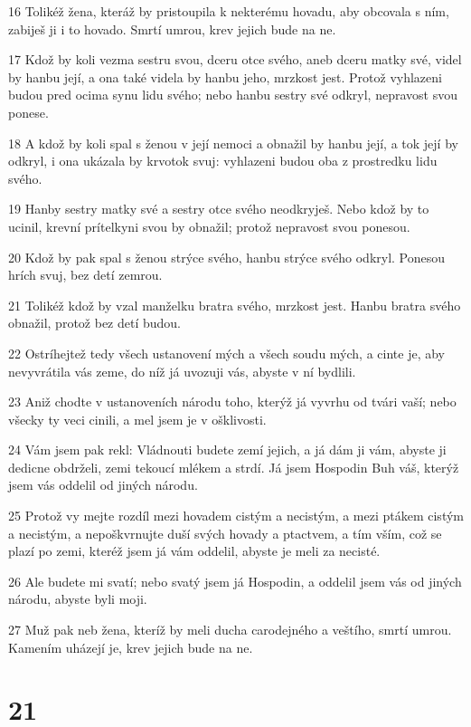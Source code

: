 \par 16 Tolikéž žena, kteráž by pristoupila k nekterému hovadu, aby obcovala s ním, zabiješ ji i to hovado. Smrtí umrou, krev jejich bude na ne.
\par 17 Kdož by koli vezma sestru svou, dceru otce svého, aneb dceru matky své, videl by hanbu její, a ona také videla by hanbu jeho, mrzkost jest. Protož vyhlazeni budou pred ocima synu lidu svého; nebo hanbu sestry své odkryl, nepravost svou ponese.
\par 18 A kdož by koli spal s ženou v její nemoci a obnažil by hanbu její, a tok její by odkryl, i ona ukázala by krvotok svuj: vyhlazeni budou oba z prostredku lidu svého.
\par 19 Hanby sestry matky své a sestry otce svého neodkryješ. Nebo kdož by to ucinil, krevní prítelkyni svou by obnažil; protož nepravost svou ponesou.
\par 20 Kdož by pak spal s ženou strýce svého, hanbu strýce svého odkryl. Ponesou hrích svuj, bez detí zemrou.
\par 21 Tolikéž kdož by vzal manželku bratra svého, mrzkost jest. Hanbu bratra svého obnažil, protož bez detí budou.
\par 22 Ostríhejtež tedy všech ustanovení mých a všech soudu mých, a cinte je, aby nevyvrátila vás zeme, do níž já uvozuji vás, abyste v ní bydlili.
\par 23 Aniž chodte v ustanoveních národu toho, kterýž já vyvrhu od tvári vaší; nebo všecky ty veci cinili, a mel jsem je v ošklivosti.
\par 24 Vám jsem pak rekl: Vládnouti budete zemí jejich, a já dám ji vám, abyste ji dedicne obdrželi, zemi tekoucí mlékem a strdí. Já jsem Hospodin Buh váš, kterýž jsem vás oddelil od jiných národu.
\par 25 Protož vy mejte rozdíl mezi hovadem cistým a necistým, a mezi ptákem cistým a necistým, a nepoškvrnujte duší svých hovady a ptactvem, a tím vším, což se plazí po zemi, kteréž jsem já vám oddelil, abyste je meli za necisté.
\par 26 Ale budete mi svatí; nebo svatý jsem já Hospodin, a oddelil jsem vás od jiných národu, abyste byli moji.
\par 27 Muž pak neb žena, kteríž by meli ducha carodejného a veštího, smrtí umrou. Kamením uházejí je, krev jejich bude na ne.

\chapter{21}

